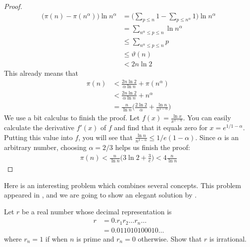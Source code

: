\begin{proof}
\begin{align*}
				\Big(\pi(n) - \pi(n^{\alpha})\Big) \ln n^{\alpha}
					& = \Big(\sum_{p \leq n} 1 - \sum_{p \leq n^{\alpha}} 1\Big) \ln n^{\alpha}\\
					& =\sum_{n^{\alpha} \leq p \leq n} \ln n^{\alpha}\\
					& \leq \sum_{n^{\alpha} \leq p \leq n} p\\
					& \leq \vartheta(n)\\
					& < 2n \ln 2
			\end{align*}
		This already means that
			\begin{align*}
				\pi(n)
					& < \frac{2n \ln 2}{\alpha \ln n} + \pi(n^{\alpha})\\
					& < \frac{2n \ln 2}{\alpha \ln n} + n^{\alpha}\\
					& = \frac{n}{\ln n} \Big(\frac{2 \ln 2}{\alpha} + \frac{\ln n}{n^{1-\alpha}} \Big)
			\end{align*}
		We use a bit calculus to finish the proof. Let $ f(x)=\frac{\ln x}{x^{1-\alpha}}$. You can easily calculate the derivative $f'(x)$ of $f$ and find that it equals zero for $x=e^{1/1-\alpha}$. Putting this value into $f$, you will see that $\frac{\ln n}{n^{1-\alpha}} \leq 1/e(1-\alpha)$. Since $\alpha$ is an arbitrary number, choosing $\alpha = 2/3$ helps us finish the proof:
			\begin{align*}
				\pi(n) < \frac{n}{\ln n} \Big(3 \ln 2 + \frac{3}{e} \Big)< 4 \frac{n}{\ln n}
			\end{align*}
	\end{proof}


Here is an interesting problem which combines several concepts. This problem appeared in \textcite[Chapter $\S 9$, section $9,3$, Theorem $137$, Page $145$]{hardy_wright_1971}, and we are going to show an elegant solution by \textcite{nasehpour_2018}.
\begin{problem}\label{prob:nasehpour}
	Let $r$ be a real number whose decimal representation is
	\begin{align*}
	r
		& = 0.r_1r_2\ldots r_n \ldots\\
		& = 0.011010100010\ldots
	\end{align*}
	where $r_n=1$ if when $n$ is prime and $r_n=0$ otherwise. Show that $r$ is irrational.
\end{problem}

